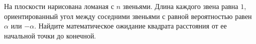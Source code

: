 \documentclass{article}
\begin{document}
На плоскости нарисована ломаная с $n$ звеньями. Длина каждого звена равна $1$, ориентированный угол между соседними звеньями с равной
вероятностью равен $\alpha$ или $-\alpha$. Найдите математическое ожидание квадрата расстояния от ее начальной точки до конечной.
\end{document}
